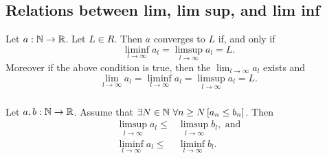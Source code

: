 \newpage

\subsection{Relations between lim, lim sup, and lim inf}
\uprop Let $a : \mathbb{N} \to \mathbb{R}$. Let $L \in R$. Then $a$ converges to $L$ if,
and only if
\[
    \liminf_{l \to \infty} a_l = \limsup_{l \to \infty} a_l = L.
\]
Moreover if the above condition is true, then the $\lim_{l \to \infty} a_l$
exists and
\[
    \lim_{l \to \infty} a_l = \liminf_{l \to \infty} a_l = \limsup_{l \to \infty} a_l = L.
\]

\subsubsection*{}
\uprop Let $a,b : \mathbb{N} \to \mathbb{R}$. Assume that $\exists N \in \mathbb{N}\ \forall n \geq N
\left[ a_n \leq b_n \right]$. Then
\begin{align*}
    \limsup_{l \to \infty} a_l \leq &\limsup_{l \to \infty} b_l, \text{ and}\\
    \liminf_{l \to \infty} a_l \leq &\liminf_{l \to \infty} b_l.
\end{align*}